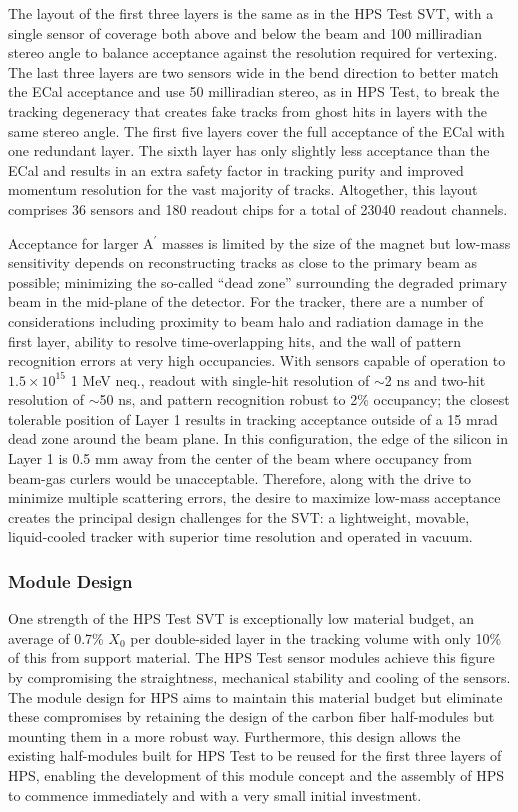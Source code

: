 
The layout of the first three layers is the same as in the HPS Test SVT, with a single sensor of coverage both above and below the beam and 100 milliradian stereo angle to balance acceptance against the resolution required for vertexing.  The last three layers are two sensors wide in the bend direction to better match the ECal acceptance and use 50 milliradian stereo, as in HPS Test, to break the tracking degeneracy that creates fake tracks from ghost hits in layers with the same stereo angle.  The first five layers cover the full acceptance of the ECal with one redundant layer.  The sixth layer has only slightly less acceptance than the ECal and results in an extra safety factor in tracking purity and improved momentum resolution for the vast majority of tracks.  Altogether, this layout comprises 36 sensors and 180 readout chips for a total of 23040 readout channels.

Acceptance for larger A$^\prime$ masses is limited by the size of the magnet but low-mass sensitivity depends on reconstructing tracks as close to the primary beam as possible; minimizing the so-called ``dead zone'' surrounding the degraded primary beam in the mid-plane of the detector.  For the tracker, there are a number of considerations including proximity to beam halo and radiation damage in the first layer, ability to resolve time-overlapping hits, and the wall of pattern recognition errors at very high occupancies. With sensors capable of operation to $1.5 \times 10^{15}$ 1 MeV neq., readout with single-hit resolution of $\sim$2 ns and two-hit resolution of $\sim$50 ns, and pattern recognition robust to 2\% occupancy; the closest tolerable position of Layer 1 results in tracking acceptance outside of a 15 mrad dead zone around the beam plane.  In this configuration, the edge of the silicon in Layer 1 is 0.5 mm away from the center of the beam where occupancy from beam-gas curlers would be unacceptable. Therefore, along with the drive to minimize multiple scattering errors, the desire to maximize low-mass acceptance creates the principal design challenges for the SVT: a lightweight, movable, liquid-cooled tracker with superior time resolution and operated in vacuum.

\subsubsection{Module Design}

One strength of the HPS Test SVT is exceptionally low material budget, an average of 0.7\% $X_0$ per double-sided layer in the tracking volume with only 10\% of this from support material.  The HPS Test sensor modules achieve this figure by compromising the straightness, mechanical stability and cooling of the sensors.  The module design for HPS aims to maintain this material budget but eliminate these compromises by retaining the design of the carbon fiber half-modules but mounting them in a more robust way. Furthermore, this design allows the existing half-modules built for HPS Test to be reused for the first three layers of HPS, enabling the development of this module concept and the assembly of HPS to commence immediately and with a very small initial investment. 

